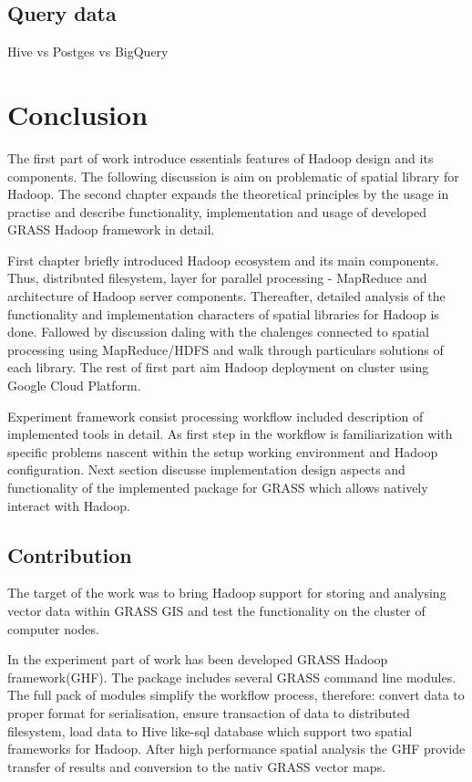 \documentclass[a4paper,12pt,oneside]{report}
\begin{document}
	\subsection{Query data}
	Hive vs Postges vs BigQuery
	
	

			
		
	
\section{Conclusion}

The first part of work introduce essentials features of Hadoop design and its components. The following discussion is aim on problematic of spatial library for Hadoop. The second chapter expands the theoretical principles by the usage in practise and describe functionality, implementation and usage of  developed GRASS Hadoop framework in detail.

First chapter briefly introduced Hadoop ecosystem and its main components. Thus, distributed filesystem, layer for parallel processing - MapReduce and architecture of Hadoop server components. Thereafter, detailed analysis of the functionality and implementation characters of spatial libraries for Hadoop is done. Fallowed by discussion daling with the chalenges connected to spatial processing using MapReduce/HDFS and walk through particulars solutions of each library. The rest of first part aim Hadoop deployment on cluster using Google Cloud Platform.

Experiment framework consist processing workflow included description of implemented tools in detail. As first step in the workflow is familiarization with specific problems nascent within the setup working environment and Hadoop configuration. Next section discusse implementation design aspects and functionality of the implemented package for GRASS which allows natively interact with Hadoop.  


\subsection*{Contribution}
The target of the work was to bring Hadoop support for storing and analysing vector data within GRASS GIS and test the functionality on the cluster of computer nodes. 

In the experiment part of work has been developed GRASS Hadoop framework(GHF). The package includes several GRASS command line modules. The full pack of modules simplify the workflow process, therefore: convert data to proper format for serialisation, ensure transaction of data to distributed filesystem, load data to Hive like-sql database which support two spatial frameworks for Hadoop. After high performance spatial analysis the GHF provide transfer of results and conversion to the nativ GRASS vector maps. 
\end{document}
